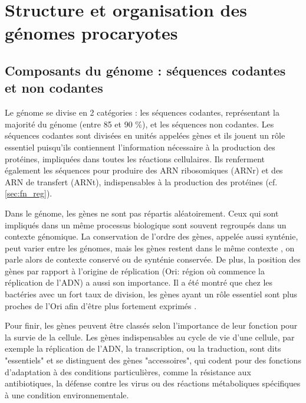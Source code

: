 \section{Structure et organisation des génomes procaryotes}
\label{sec:structure_org}

\subsection{Composants du génome : séquences codantes et non codantes}
\label{sec:gene}
Le génome se divise en 2 catégories : les séquences codantes, représentant la majorité du génome (entre 85 et 90 \%), et les séquences non codantes. Les séquences codantes sont divisées en unités appelées gènes et ils jouent un rôle essentiel puisqu’ils contiennent l’information nécessaire à la production des protéines, impliquées dans toutes les réactions cellulaires. Ils renferment également les séquences pour produire des ARN ribosomiques (ARNr) et des ARN de transfert (ARNt), indispensables à la production des protéines (cf. \autoref{sec:fn_reg}).

Dans le génome, les gènes ne sont pas répartis aléatoirement. Ceux qui sont impliqués dans un même processus biologique sont souvent regroupés dans un contexte génomique. La conservation de l'ordre des gènes, appelée aussi synténie, peut varier entre les génomes, mais les gènes restent dans le même contexte \cite{lathe_gene_2000}, on parle alors de contexte conservé ou de synténie conservée. De plus, la position des gènes par rapport à l'origine de réplication (Ori: région où commence la réplication de l'ADN) a aussi son importance. Il a été montré que chez les bactéries avec un fort taux de division, les gènes ayant un rôle essentiel sont plus proches de l'Ori afin d'être plus fortement exprimés \cite{sharp_chromosomal_1989,vieira-silva_systemic_2010}.

Pour finir, les gènes peuvent être classés selon l’importance de leur fonction pour la survie de la cellule. Les gènes indispensables au cycle de vie d'une cellule, par exemple la réplication de l’ADN, la transcription, ou la traduction, sont dits "essentiels" et se distinguent des gènes "accessoires", qui codent pour des fonctions d'adaptation à des conditions particulières, comme la résistance aux antibiotiques, la défense contre les virus ou des réactions métaboliques spécifiques à une condition environnementale.

